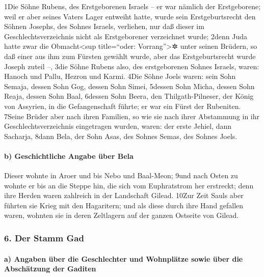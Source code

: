 1Die Söhne Rubens, des Erstgeborenen Israels -- er war nämlich der
Erstgeborene; weil er aber seines Vaters Lager entweiht hatte, wurde
sein Erstgeburtsrecht den Söhnen Josephs, des Sohnes Israels, verliehen,
nur daß dieser im Geschlechtsverzeichnis nicht als Erstgeborener
verzeichnet wurde; 2denn Juda hatte zwar die Obmacht\textless sup
title=``oder: Vorrang''\textgreater✲ unter seinen Brüdern, so daß einer
aus ihm zum Fürsten gewählt wurde, aber das Erstgeburtsrecht wurde
Joseph zuteil --, 3die Söhne Rubens also, des erstgeborenen Sohnes
Israels, waren: Hanoch und Pallu, Hezron und Karmi. 4Die Söhne Joels
waren: sein Sohn Semaja, dessen Sohn Gog, dessen Sohn Simei, 5dessen
Sohn Micha, dessen Sohn Reaja, dessen Sohn Baal, 6dessen Sohn Beera, den
Thilgath-Pilneser, der König von Assyrien, in die Gefangenschaft führte;
er war ein Fürst der Rubeniten. 7Seine Brüder aber nach ihren Familien,
so wie sie nach ihrer Abstammung in ihr Geschlechtsverzeichnis
eingetragen wurden, waren: der erste Jehiel, dann Sacharja, 8dann Bela,
der Sohn Asas, des Sohnes Semas, des Sohnes Joels.

\hypertarget{b-geschichtliche-angabe-uxfcber-bela}{%
\paragraph{b) Geschichtliche Angabe über
Bela}\label{b-geschichtliche-angabe-uxfcber-bela}}

Dieser wohnte in Aroer und bis Nebo und Baal-Meon; 9und nach Osten zu
wohnte er bis an die Steppe hin, die sich vom Euphratstrom her
erstreckt; denn ihre Herden waren zahlreich in der Landschaft Gilead.
10Zur Zeit Sauls aber führten sie Krieg mit den Hagaritern; und als
diese durch ihre Hand gefallen waren, wohnten sie in deren Zeltlagern
auf der ganzen Ostseite von Gilead.

\hypertarget{der-stamm-gad}{%
\subsubsection{6. Der Stamm Gad}\label{der-stamm-gad}}

\hypertarget{a-angaben-uxfcber-die-geschlechter-und-wohnpluxe4tze-sowie-uxfcber-die-abschuxe4tzung-der-gaditen}{%
\paragraph{a) Angaben über die Geschlechter und Wohnplätze sowie über
die Abschätzung der
Gaditen}\label{a-angaben-uxfcber-die-geschlechter-und-wohnpluxe4tze-sowie-uxfcber-die-abschuxe4tzung-der-gaditen}}


